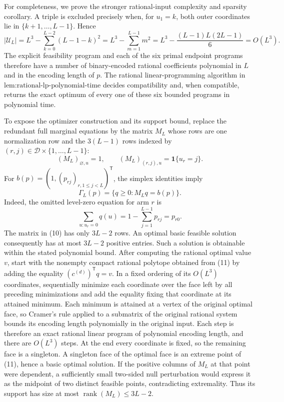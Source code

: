 For completeness, we prove the stronger rational-input complexity and sparsity corollary.  A triple is excluded precisely when, for \(u_1=k\), both outer coordinates lie in \(\{k+1,\ldots,L-1\}\).  Hence
\[
 |\mathcal U_L|
 =L^3-\sum_{k=0}^{L-2}(L-1-k)^2
 =L^3-\sum_{m=1}^{L-1}m^2
 =L^3-\frac{(L-1)L(2L-1)}6
 =O(L^3).
 \tag{9}
\]
The explicit feasibility program and each of the six primal endpoint programs therefore have a number of binary-encoded rational coefficients polynomial in \(L\) and in the encoding length of \(p\).  The rational linear-programming algorithm in \(\text{lem:rational-lp-polynomial-time}\) decides compatibility and, when compatible, returns the exact optimum of every one of these six bounded programs in polynomial time.

To expose the optimizer construction and its support bound, replace the redundant full marginal equations by the matrix \(M_L\) whose rows are one normalization row and the \(3(L-1)\) rows indexed by \((r,j)\in\mathcal D\times\{1,\ldots,L-1\}\):
\[
 (M_L)_{\varnothing,u}=1,
 \qquad
 (M_L)_{(r,j),u}=\mathbf 1\{u_r=j\}.
 \tag{10}
\]
For \(b(p)=(1,(p_{rj})_{r,1\le j<L})^{\mathsf T}\), the simplex identities imply
\[
 \Gamma_L(p)=\{q\ge0:M_Lq=b(p)\}.
 \tag{11}
\]
Indeed, the omitted level-zero equation for arm \(r\) is
\[
 \sum_{u:u_r=0}q(u)
 =1-\sum_{j=1}^{L-1}p_{rj}=p_{r0}.
\]
The matrix in (10) has only \(3L-2\) rows.  An optimal basic feasible solution consequently has at most \(3L-2\) positive entries.  Such a solution is obtainable within the stated polynomial bound.  After computing the rational optimal value \(v\), start with the nonempty compact rational polytope obtained from (11) by adding the equality \((c^{(d)})^{\mathsf T}q=v\).  In a fixed ordering of its \(O(L^3)\) coordinates, sequentially minimize each coordinate over the face left by all preceding minimizations and add the equality fixing that coordinate at its attained minimum.  Each minimum is attained at a vertex of the original optimal face, so Cramer's rule applied to a submatrix of the original rational system bounds its encoding length polynomially in the original input.  Each step is therefore an exact rational linear program of polynomial encoding length, and there are \(O(L^3)\) steps.  At the end every coordinate is fixed, so the remaining face is a singleton.  A singleton face of the optimal face is an extreme point of (11), hence a basic optimal solution.  If the positive columns of \(M_L\) at that point were dependent, a sufficiently small two-sided null perturbation would express it as the midpoint of two distinct feasible points, contradicting extremality.  Thus its support has size at most \(\operatorname{rank}(M_L)\le3L-2\).

